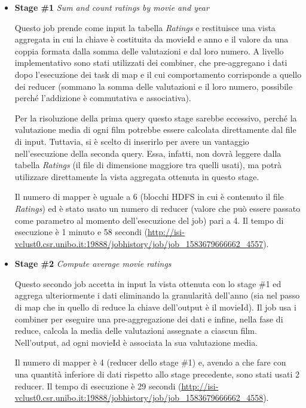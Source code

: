 \documentclass[10pt]{article}
\begin{document}
\begin{itemize}
\item \textbf{Stage \#1} \textit{Sum and count ratings by movie and year}

Questo job prende come input la tabella \textit{Ratings} e restituisce una vista aggregata in cui la chiave è costituita da movieId e anno e il valore da una coppia formata dalla somma delle valutazioni e dal loro numero. A livello implementativo sono stati utilizzati dei combiner, che pre-aggregano i dati dopo l'esecuzione dei task di map e il cui comportamento corrisponde a quello dei reducer (sommano la somma delle valutazioni e il loro numero, possibile perché l'addizione è commutativa e associativa).

Per la risoluzione della prima query questo stage sarebbe eccessivo, perché la valutazione media di ogni film potrebbe essere calcolata direttamente dal file di input. Tuttavia, si è scelto di inserirlo per avere un vantaggio nell'esecuzione della seconda query. Essa, infatti, non dovrà leggere dalla tabella \textit{Ratings} (il file di dimensione maggiore tra quelli usati), ma potrà utilizzare direttamente la vista aggregata ottenuta in questo stage.

Il numero di mapper è uguale a 6 (blocchi HDFS in cui è contenuto il file \textit{Ratings}) ed è stato usato un numero di reducer (valore che può essere passato come parametro al momento dell'esecuzione del job) pari a 4. Il tempo di esecuzione è 1 minuto e 58 secondi (\url{http://isi-vclust0.csr.unibo.it:19888/jobhistory/job/job_1583679666662_4557}).

\item \textbf{Stage \#2} \textit{Compute average movie ratings}

Questo secondo job accetta in input la vista ottenuta con lo stage \#1 ed aggrega ulteriormente i dati eliminando la granularità dell'anno (sia nel passo di map che in quello di reduce la chiave dell'output è il movieId). Il job usa i combiner per eseguire una pre-aggregazione dei dati e infine, nella fase di reduce, calcola la media delle valutazioni assegnate a ciascun film. Nell'output, ad ogni movieId è associata la sua valutazione media.

Il numero di mapper è 4 (reducer dello stage \#1) e, avendo a che fare con una quantità inferiore di dati rispetto allo stage precedente, sono stati usati 2 reducer. Il tempo di esecuzione è 29 secondi (\url{http://isi-vclust0.csr.unibo.it:19888/jobhistory/job/job_1583679666662_4558}).


\end{itemize}
\end{document}
